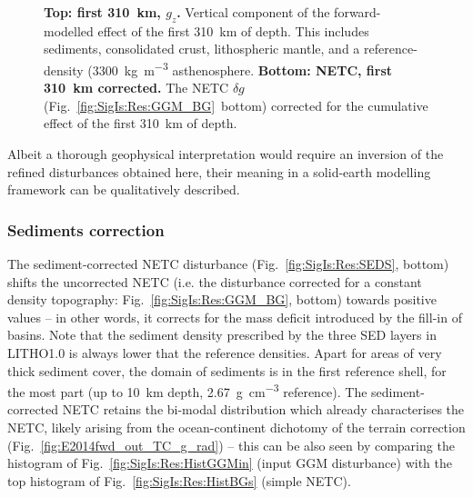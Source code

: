 \begin{figure}
    \begin{adjustbox}{center}
    \end{adjustbox}
    \caption[Map of the effect of the first \SI{310}{\kilo \metre} of forward-modelled masses and NETC $\delta g$ corrected for them.]{
        \textbf{Top: first \SI{310}{\kilo \metre}, $g_z$.} Vertical component of the forward-modelled effect of the first \SI{310}{\kilo \metre} of depth. This includes sediments, consolidated crust, lithospheric mantle, and a reference-density (\SI{3300}{\kilo \gram \per \cubic \metre} asthenosphere.
        \textbf{Bottom: NETC, first \SI{310}{\kilo \metre} corrected.} The NETC $\delta g$ (Fig.~\ref{fig:SigIs:Res:GGM_BG}~bottom) corrected for the cumulative effect of the first \SI{310}{\kilo \metre} of depth.
    }
    \label{fig:SigIs:Res:Deep}
\end{figure}

\FloatBarrier

Albeit a thorough geophysical interpretation would require an inversion of the refined disturbances obtained here, their meaning in a solid-earth modelling framework can be qualitatively described.

\subsubsection{Sediments correction}
\label{sss:SigIs:Results:Maps:SEDS}
The sediment-corrected NETC disturbance (Fig.~\ref{fig:SigIs:Res:SEDS}, bottom) shifts the uncorrected NETC (i.e. the disturbance corrected for a constant density topography: Fig.~\ref{fig:SigIs:Res:GGM_BG}, bottom) towards positive values -- in other words, it corrects for the mass deficit introduced by the fill-in of basins.
Note that the sediment density prescribed by the three SED layers in LITHO1.0 is always lower that the reference densities.
Apart for areas of very thick sediment cover, the domain of sediments is in the first reference shell, for the most part (up to \SI{10}{\km} depth, \SI{2.67}{\gram \per \cubic \centi \metre} reference).
The sediment-corrected NETC retains the bi-modal distribution which already characterises the NETC, likely arising from the ocean-continent dichotomy of the terrain correction (Fig.~\ref{fig:E2014fwd_out_TC_g_rad}) -- this can be also seen by comparing the histogram of Fig.~\ref{fig:SigIs:Res:HistGGMin} (input GGM disturbance) with the top histogram of Fig.~\ref{fig:SigIs:Res:HistBGs} (simple NETC).

